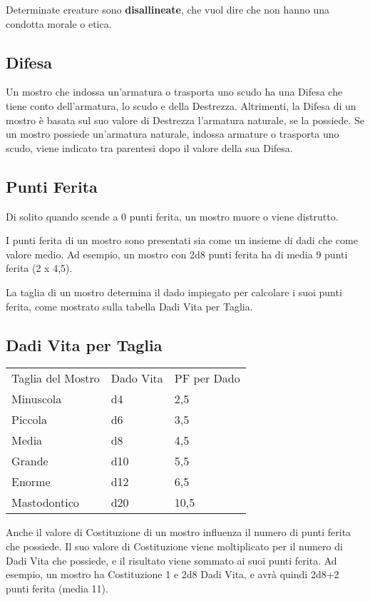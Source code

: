 Determinate creature  sono \textbf{disallineate}, che vuol dire che non hanno una condotta morale o etica.

\subsection{Difesa}

Un mostro che indossa un'armatura o trasporta uno scudo ha una Difesa che tiene conto dell'armatura, lo scudo e della Destrezza. Altrimenti, la Difesa di un mostro è basata sul suo valore di Destrezza l'armatura naturale, se la possiede. Se un mostro possiede un'armatura naturale, indossa armature o trasporta uno scudo, viene indicato tra parentesi dopo il valore della sua Difesa.

\subsection{Punti Ferita}

Di solito quando scende a 0 punti ferita, un mostro muore o viene
distrutto.

I punti ferita di un mostro sono presentati sia come un insieme di dadi
che come valore medio. Ad esempio, un mostro con 2d8 punti ferita ha di
media 9 punti ferita (2 x 4,5).

La taglia di un mostro determina il dado impiegato per calcolare i suoi
punti ferita, come mostrato sulla tabella Dadi Vita per Taglia.

\subsection{Dadi Vita per Taglia}

\medskip
\begin{tabular}{lll}
\toprule
Taglia del Mostro & Dado Vita & PF per Dado\\
Minuscola &d4&2,5\\
Piccola &d6&3,5\\
Media&d8 &4,5\\
Grande&d10&5,5\\
Enorme&d12&6,5\\
Mastodontico&d20&10,5\\
\end{tabular}
\medskip

Anche il valore di Costituzione di un mostro influenza il numero di punti ferita che possiede. Il suo valore di Costituzione viene moltiplicato per il numero di Dadi Vita che possiede, e il risultato viene sommato ai suoi punti ferita. Ad esempio, un mostro ha Costituzione 1 e 2d8 Dadi Vita, e avrà quindi 2d8+2 punti ferita (media 11).

